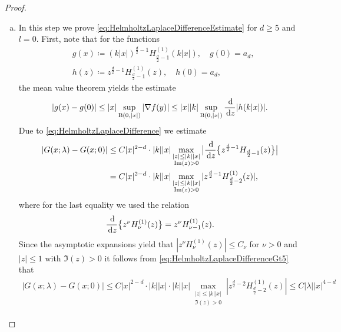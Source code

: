 \begin{proof}
\begin{enumerate}[(a)]
  \item In this step we prove \eqref{eq:HelmholtzLaplaceDifferenceEstimate} for $d \geq 5$ and $l = 0$. 
    First, note that for the functions
    \begin{align*}
      &g(x) \coloneqq (k|x|)^{\frac{d}{2} - 1} H_{\frac{d}{2} - 1}^{(1)}(k|x|), \quad g(0) = a_d, \\
      &h(z) \coloneqq z^{\frac{d}{2} - 1} H_{\frac{d}{2} - 1}^{(1)}(z), \quad h(0) = a_d,
    \end{align*}
    the mean value theorem yields the estimate
    \begin{align*}
      |g(x) - g(0)| \leq |x| \sup_{\mathrm{B}(0,|x|)} |\nabla f(y)| \leq |x| |k| \sup_{\mathrm{B}(0,|x|)} \frac{\, {\operatorname{d}\!{}}}{\, {\operatorname{d}\!{z}}} |h(k|x|)|.
    \end{align*}
    Due to \eqref{eq:HelmholtzLaplaceDifference} we estimate
    \begin{align}
      |G(x; \lambda) - G(x; 0) |
      &\leq C |x|^{2 - d} \cdot |k| |x| \max_{\substack{|z| \leq |k| |x| \\ \operatorname{Im}(z) > 0}} \big| \frac{\, {\operatorname{d}\!{}}}{\, {\operatorname{d}\!{z}}} \big\{ z^{\frac{d}{2} - 1} H_{\frac{d}{2} - 1}(z) \big\} \big| \nonumber\\
      &= C |x|^{2 - d} \cdot |k| |x| \max_{\substack{|z| \leq |k||x| \\ \operatorname{Im}(z) > 0}} |z^{\frac{d}{2} - 1} H_{\frac{d}{2} - 2}^{(1)}(z) |, \label{eq:HelmholtzLaplaceDifferenceGt5}
    \end{align}
    where for the last equality we used the relation
    \begin{align}
      \frac{\, {\operatorname{d}\!{}}}{\, {\operatorname{d}\!{z}}} \big\{ z^\nu H_\nu^{(1)}(z) \big\} = z^\nu H_{\nu - 1}^{(1)}(z).
    \end{align}
    Since the asymptotic expansions yield that $|z^{\nu} H_\nu^{(1)}(z)| \leq C_\nu$ for $\nu > 0$ and $|z| \leq 1$ with $\Im(z) > 0$ it follows from \eqref{eq:HelmholtzLaplaceDifferenceGt5} that
    \begin{align*}
      |G(x;\lambda) - G(x; 0)| \leq C |x|^{2 - d} \cdot |k| |x| \cdot |k| |x| \max_{\substack{|z| \leq |k||x| \\ \Im(z) > 0}} |z^{\frac{d}{2} - 2} H_{\frac{d}{2} - 2}^{(1)}(z) |
      \leq C |\lambda| |x|^{4 - d}
    \end{align*}
    

\end{enumerate}
\end{proof}
